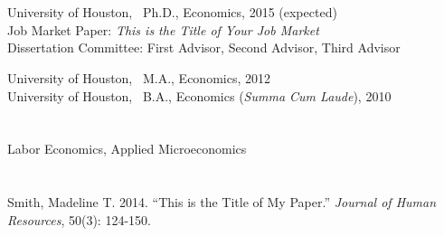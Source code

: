 \documentclass[margin, 11pt]{res} %
\begin{document}
\begin{resume}






\section{}
University of Houston,  \  Ph.D., Economics, 2015 (expected)\\
\hspace*{5mm}Job Market Paper: \textit{This is the Title of Your Job Market}\\ 
\hspace*{5mm}Dissertation Committee:  First Advisor, Second Advisor, Third Advisor

University of Houston,  \  M.A., Economics, 2012\\
University of Houston,  \  B.A., Economics (\emph{Summa Cum Laude}), 2010





\section{}
Labor Economics, Applied Microeconomics\\


\section{}
Smith, Madeline T. 2014. ``This is the Title of My Paper.'' \emph{Journal of Human Resources}, 50(3): 124-150.\\
 

\section{ }


\end{resume}
\end{document}
